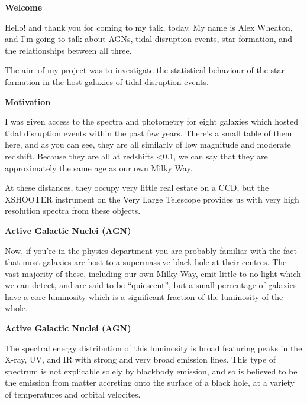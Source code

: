 \documentclass[a4paper,11pt]{article}
\begin{document}
\noindent \newline \textbf{Welcome}

\noindent \newline Hello! and thank you for coming to my talk, today. My name is Alex Wheaton,
and I'm going to talk about AGNs, tidal disruption events, star formation,
and the relationships between all three.

\noindent \newline The aim of my project was to investigate the statistical behaviour of the star formation in the host galaxies of tidal disruption events.

\noindent \newline \textbf{Motivation}

\noindent \newline I was given access to the spectra and photometry for eight galaxies which
hosted tidal disruption events within the past few years. There's a small
table of them here, and as you can see, they are all similarly of low
magnitude and moderate redshift. Because they are all at redshifts <0.1, we
can say that they are approximately the same age as our own Milky Way.

\noindent \newline At these distances, they occupy very little real estate on a CCD, but the
XSHOOTER instrument on the Very Large Telescope provides us with very high
resolution spectra from these objects.

\noindent \newline \textbf{Active Galactic Nuclei (AGN)}

\noindent \newline Now, if you're in the physics department you are probably familiar with the fact
that most galaxies are host to a supermassive black hole at their centres. The
vast majority of these, including our own Milky Way, emit little to no light which we can
detect, and are said to be ``quiescent'', but a small percentage of galaxies
have a core luminosity which is a significant fraction of the luminosity of the
whole.

\noindent \newline \textbf{Active Galactic Nuclei (AGN)}

\noindent \newline The spectral energy distribution of this luminosity is broad featuring peaks in
the X-ray, UV, and IR with strong and very broad emission lines. This type of
spectrum is not explicable solely by blackbody emission, and so is believed to
be the emission from matter accreting onto the surface of a black hole, at a
variety of temperatures and orbital velocites.
\end{document}
